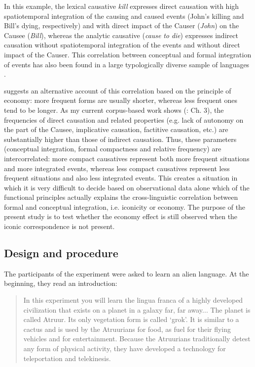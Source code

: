 \documentclass[output=paper]{langsci/langscibook}
\begin{document}
In this example, the lexical causative \textit{kill} expresses direct causation with high spatiotemporal integration of the causing and caused events (John’s killing and Bill’s dying, respectively) and with direct impact of the Causer (\textit{John}) on the Causee (\textit{Bill}), whereas the analytic causative (\textit{cause} \textit{to} \textit{die}) expresses indirect causation without spatiotemporal integration of the events and without direct impact of the Causer. This correlation between conceptual and formal integration of events has also been found in a large typologically diverse sample of languages \citep{Levshina2018_CausTyp}.

\citet{Haspelmath2008_FreqIcon} suggests an alternative account of this correlation based on the principle of economy: more frequent forms are usually shorter, whereas less frequent ones tend to be longer. As my current corpus-based work shows (\citealt{Levshina2018_Effic}: Ch. 3), the frequencies of direct causation and related properties (e.g. lack of autonomy on the part of the Causee, implicative causation, factitive causation, etc.) are substantially higher than those of indirect causation. Thus, these parameters (conceptual integration, formal compactness and relative frequency) are intercorrelated: more compact causatives represent both more frequent situations and more integrated events, whereas less compact causatives represent less frequent situations and also less integrated events. This creates a situation in which it is very difficult to decide based on observational data alone which of the functional principles actually explains the cross-linguistic correlation between formal and conceptual integration, i.e. iconicity or economy. The purpose of the present study is to test whether the economy effect is still observed when the iconic correspondence is not present. 

\subsection{Design and procedure}

The participants of the experiment were asked to learn an alien language. At the beginning, they read an introduction:

\begin{quote}
In this experiment you will learn the lingua franca of a highly developed civilization that exists on a planet in a galaxy far, far away...  The planet is called Atruur. Its only vegetation form is called ‘grok’. It is similar to a cactus and is used by the Atruurians for food, as fuel for their flying vehicles and for entertainment. Because the Atruurians traditionally detest any form of physical activity, they have developed a technology for teleportation and telekinesis.
\end{quote}
\end{document}
